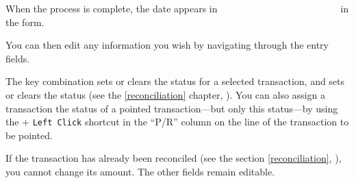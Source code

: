 When the process is complete, the date appears in \colorbox[RGB]{61,174,233}{\textcolor{white}{\textsf{white on a blue background}}} in the form.

You can then edit any information you wish by navigating through the entry fields.

The  key combination sets or clears the  status for a selected transaction, and  sets or clears the  status (see the \vref{reconciliation} chapter, ). You can also assign a transaction the status of a pointed transaction—but only this status—by using the  + \texttt{Left Click} shortcut in the \enquote{P/R} column on the line of the transaction to be pointed.

If the transaction has already been reconciled (see the section \vref{reconciliation}, ), you cannot change its amount. The other fields remain editable.

